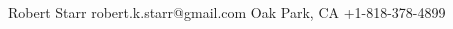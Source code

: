 \documentclass[lighthipster]{simplehipstercv}
\newlength{\rightcolwidth}
\begin{document}
\begin{paracol}{2}
\begin{minipage}[t]{0.3\textwidth}


\end{minipage}






\vfill{} %

\setlength{\parindent}{0pt}
\begin{minipage}[t]{\rightcolwidth}
\begin{center}\fontfamily{\sfdefault}\selectfont \color{black!70}
{\small Robert Starr  robert.k.starr@gmail.com  Oak Park, CA  +1-818-378-4899 \newline%
}
\end{center}
\end{minipage}

\end{paracol}
\end{document}
